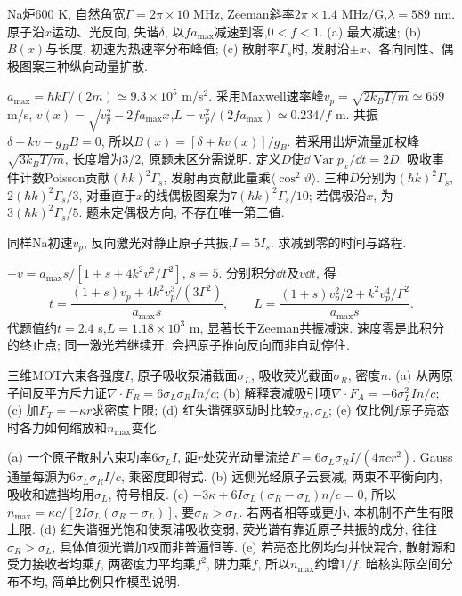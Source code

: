 \begin{exercise}Na炉600 K, 自然角宽$\Gamma=2\pi\times10$ MHz, Zeeman斜率$2\pi\times1.4$ MHz/G,$\lambda=589$ nm. 原子沿$x$运动、光反向, 失谐$\delta$, 以$f a_{\max}$减速到零,$0<f<1$. (a) 最大减速; (b) $B(x)$与长度, 初速为热速率分布峰值; (c) 散射率$\Gamma_s$时, 发射沿$\pm x$、各向同性、偶极图案三种纵向动量扩散.\end{exercise}
\begin{solution}$a_{\max}=\hbar k\Gamma/(2m)\simeq9.3\times10^5$ m/s$^2$. 采用Maxwell速率峰$v_p=\sqrt{2k_BT/m}\simeq659$ m/s, $v(x)=\sqrt{v_p^2-2fa_{\max}x}$,$L=v_p^2/(2fa_{\max})\simeq0.234/f$ m. 共振$\delta+kv-g_BB=0$, 所以$B(x)=[\delta+kv(x)]/g_B$. 若采用出炉流量加权峰$\sqrt{3k_BT/m}$, 长度增为3/2, 原题未区分需说明. 定义$D$使$\dd\operatorname{Var}p_x/\dd t=2D$. 吸收事件计数Poisson贡献$(\hbar k)^2\Gamma_s$, 发射再贡献此量乘$\langle\cos^2\vartheta\rangle$. 三种$D$分别为$(\hbar k)^2\Gamma_s$, $2(\hbar k)^2\Gamma_s/3$, 对垂直于$x$的线偶极图案为$7(\hbar k)^2\Gamma_s/10$; 若偶极沿$x$, 为$3(\hbar k)^2\Gamma_s/5$. 题未定偶极方向, 不存在唯一第三值.
\end{solution}
\begin{exercise}同样Na初速$v_p$, 反向激光对静止原子共振,$I=5I_s$. 求减到零的时间与路程.\end{exercise}
\begin{solution}$-\dot v=a_{\max}s/[1+s+4k^2v^2/\Gamma^2]$, $s=5$. 分别积分$\dd t$及$v\dd t$, 得
\[t=\frac{(1+s)v_p+4k^2v_p^3/(3\Gamma^2)}{a_{\max}s},\qquad L=\frac{(1+s)v_p^2/2+k^2v_p^4/\Gamma^2}{a_{\max}s}.\]
代题值约$t=2.4$ s,$L=1.18\times10^3$ m, 显著长于Zeeman共振减速. 速度零是此积分的终止点; 同一激光若继续开, 会把原子推向反向而非自动停住.
\end{solution}
\begin{exercise}三维MOT六束各强度$I$, 原子吸收泵浦截面$\sigma_L$, 吸收荧光截面$\sigma_R$, 密度$n$. (a) 从两原子间反平方斥力证$\nabla\cdot F_R=6\sigma_L\sigma_RIn/c$; (b) 解释衰减吸引项$\nabla\cdot F_A=-6\sigma_L^2In/c$; (c) 加$F_T=-\kappa r$求密度上限; (d) 红失谐强驱动时比较$\sigma_R,\sigma_L$; (e) 仅比例$f$原子亮态时各力如何缩放和$n_{\max}$变化.\end{exercise}
\begin{solution}(a) 一个原子散射六束功率$6\sigma_LI$, 距$r$处荧光动量流给$F=6\sigma_L\sigma_RI/(4\pi cr^2)$. Gauss通量每源为$6\sigma_L\sigma_RI/c$, 乘密度即得式. (b) 远侧光经原子云衰减, 两束不平衡向内, 吸收和遮挡均用$\sigma_L$, 符号相反. (c) $-3\kappa+6I\sigma_L(\sigma_R-\sigma_L)n/c=0$, 所以$n_{\max}=\kappa c/[2I\sigma_L(\sigma_R-\sigma_L)]$, 要$\sigma_R>\sigma_L$. 若两者相等或更小, 本机制不产生有限上限. (d) 红失谐强光饱和使泵浦吸收变弱, 荧光谱有靠近原子共振的成分, 往往$\sigma_R>\sigma_L$, 具体值须光谱加权而非普遍恒等. (e) 若亮态比例均匀并快混合, 散射源和受力接收者均乘$f$, 两密度力平均乘$f^2$, 阱力乘$f$, 所以$n_{\max}$约增$1/f$. 暗核实际空间分布不均, 简单比例只作模型说明.
\end{solution}

